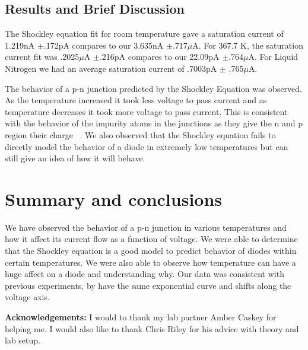 \documentclass[11pt,letterpaper,onecolumn]{article}
\begin{document}
\subsection{Results and Brief Discussion}

The Shockley equation fit for room temperature gave a saturation current of 1.219nA $\pm$.172pA compares to our 3.635nA  $\pm$.717$\mu$A. For 367.7 K, the saturation current fit was .2025$\mu$A $\pm$.216pA compares to our 22.09pA $\pm$.764$\mu$A. For Liquid Nitrogen we had an average saturation current of .7003pA $\pm$ .765$\mu$A.

The behavior of a p-n junction predicted by the Shockley Equation was observed. As the temperature increased it took less voltage to pass current and as temperature decreases it took more voltage to pass current. This is consistent with the behavior of the impurity atoms in the junctions as they give the n and p region their charge ~\cite{Shock}. We also observed that the Shockley equation fails to directly model the behavior of a diode in extremely low temperatures but can still give an idea of how it will behave.


\section{Summary and conclusions}

We have observed the behavior of a p-n junction in various temperatures and how it affect its current flow as a function of voltage. We were able to determine that the Shockley equation is a good model to predict behavior of diodes within certain temperatures. We were also able to observe how temperature can have a huge affect on a diode and understanding why. Our data was consistent with previous experiments, by have the same exponential curve and shifts along the voltage axis. 


{\bf Acknowledgements:} I would to thank my lab partner Amber Caskey for helping me. I would also like to thank Chris Riley for his advice with theory and lab setup.

\end{document}
